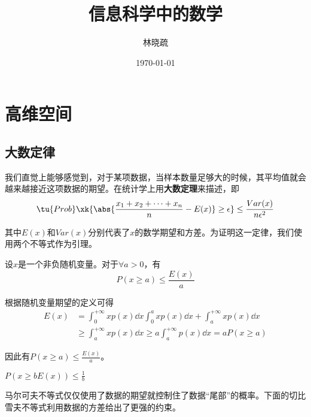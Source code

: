\documentclass[UTF8]{ctexbook}
\title{信息科学中的数学}
\author{林晓疏}
\date{\today}
\begin{document}
\maketitle
\tableofcontents

\mainmatter%

\chapter{高维空间}

\section{大数定律}
我们直觉上能够感觉到，对于某项数据，当样本数量足够大的时候，其平均值就会越来越接近这项数据的期望。在统计学上用\textbf{大数定理}来描述，即
\begin{equation}
	\tu{Prob}\xk{\abs{\frac{x_1 + x_2 + \cdots + x_n}{n} - E(x)} \ge \epsilon } \le \frac{Var(x)}{n \epsilon^2} 
	\label{thm:BigNum}
\end{equation}

其中$E(x)$和$Var(x)$分别代表了$x$的数学期望和方差。为证明这一定律，我们使用两个不等式作为引理。

\begin{lemma}
设$x$是一个非负随机变量。对于$\forall a>0$，有
\begin{equation}
	P(x\ge a) \le \frac{E(x)}{a}
	\label{neq:Markov}
\end{equation}
\end{lemma}

\begin{lproof}
根据随机变量期望的定义可得
\begin{equation}
\begin{split}
E(x) &= \int_{0}^{+\infty} xp(x)\dd x \int_{0}^{a} xp(x)\dd x + \int_{a}^{+\infty} xp(x) \dd x
\\
&\ge \int_{a}^{+\infty} xp(x) \dd x \ge a\int_{a}^{+\infty}p(x) \dd x = aP(x\ge a)
\end{split}
\end{equation}

因此有$P(x \ge a) \le \frac{E(x)}{a}$。
\end{lproof}

\begin{tuilun}
$P(x \ge bE(x)) \le \frac{1}{b}$
\end{tuilun}

马尔可夫不等式仅仅使用了数据的期望就控制住了数据“尾部”的概率。下面的切比雪夫不等式利用数据的方差给出了更强的约束。
\end{document}

